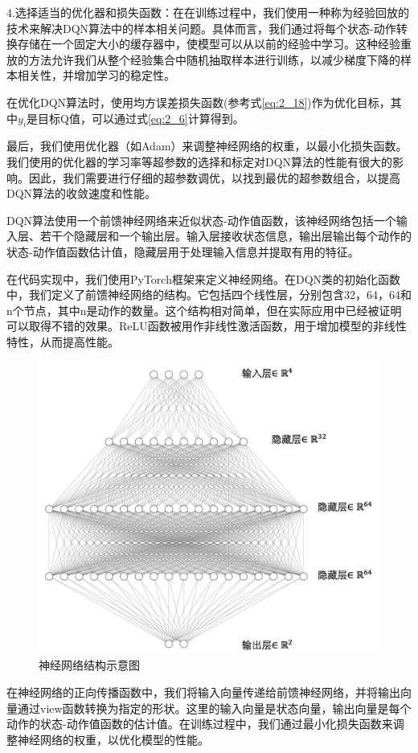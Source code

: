 4.选择适当的优化器和损失函数：在在训练过程中，我们使用一种称为经验回放的技术来解决DQN算法中的样本相关问题。具体而言，我们通过将每个状态-动作转换存储在一个固定大小的缓存器中，使模型可以从以前的经验中学习。这种经验重放的方法允许我们从整个经验集合中随机抽取样本进行训练，以减少梯度下降的样本相关性，并增加学习的稳定性。

在优化DQN算法时，使用均方误差损失函数(参考式\ref{eq:2_18})作为优化目标，其中$y_i$是目标Q值，可以通过式\ref{eq:2_6}计算得到。

最后，我们使用优化器（如Adam）来调整神经网络的权重，以最小化损失函数。我们使用的优化器的学习率等超参数的选择和标定对DQN算法的性能有很大的影响。因此，我们需要进行仔细的超参数调优，以找到最优的超参数组合，以提高DQN算法的收敛速度和性能。


DQN算法使用一个前馈神经网络来近似状态-动作值函数，该神经网络包括一个输入层、若干个隐藏层和一个输出层。输入层接收状态信息，输出层输出每个动作的状态-动作值函数估计值，隐藏层用于处理输入信息并提取有用的特征。

在代码实现中，我们使用PyTorch框架来定义神经网络。在DQN类的初始化函数中，我们定义了前馈神经网络的结构。它包括四个线性层，分别包含32，64，64和n个节点，其中n是动作的数量。这个结构相对简单，但在实际应用中已经被证明可以取得不错的效果。ReLU函数被用作非线性激活函数，用于增加模型的非线性特性，从而提高性能。

\begin{figure}[H]
  \centering
  \includegraphics[width=.75\linewidth]{figures/content/neuralnet.png}
  \caption{神经网络结构示意图}
  \label{neuralnet}
\end{figure}

在神经网络的正向传播函数中，我们将输入向量传递给前馈神经网络，并将输出向量通过view函数转换为指定的形状。这里的输入向量是状态向量，输出向量是每个动作的状态-动作值函数的估计值。在训练过程中，我们通过最小化损失函数来调整神经网络的权重，以优化模型的性能。



